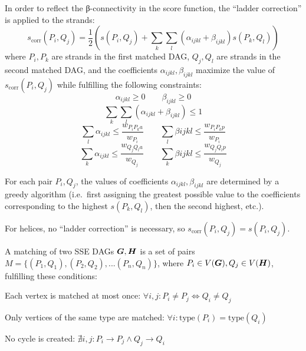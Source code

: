\documentclass{article}
\begin{document}
In order to reflect the β-connectivity in the score function, 
the ``ladder correction'' is applied to the strands:
  \[  s_\mathrm{corr}(P_i, Q_j) = \frac{1}{2} \left( s(P_i, Q_j) + \sum_k \sum_l (\alpha_{ijkl} + \beta_{ijkl}) s(P_k, Q_l) \right)  \]
where \(P_i, P_k\) are strands in the first matched DAG, 
\(Q_j, Q_l\) are strands in the second matched DAG, 
and the coefficients \(\alpha_{ijkl}, \beta_{ijkl}\) 
maximize the value of \(s_\mathrm{corr}(P_i, Q_j)\)
while fulfilling the following constraints:
  \[  \alpha_{ijkl} \geq 0 \qquad  \beta_{ijkl} \geq 0  \]
  \[  \sum_k \sum_l (\alpha_{ijkl} + \beta_{ijkl}) \leq 1  \]
  \[  \sum_l \alpha_{ijkl} \leq \frac{w_{P_i P_k a}}{w_{P_i}}  \qquad  \sum_l \beta{ijkl} \leq \frac{w_{P_i P_k p}}{w_{P_i}}  \]
  \[  \sum_k \alpha_{ijkl} \leq \frac{w_{Q_j Q_l a}}{w_{Q_j}}  \qquad  \sum_k \beta{ijkl} \leq \frac{w_{Q_j Q_l p}}{w_{Q_j}}  \]

For each pair \(P_i, Q_j\), the values of coefficients \(\alpha_{ijkl}, \beta_{ijkl}\) 
are determined by a greedy algorithm (i.e.~first assigning the greatest possible value 
to the coefficients corresponding to the highest \(s(P_k, Q_l)\), then the second highest, etc.). 

For helices, no ``ladder correction'' is necessary, so \(s_\mathrm{corr}(P_i, Q_j) = s(P_i, Q_j)\).

A matching of two SSE DAGs \(\boldsymbol{G}, \boldsymbol{H}\) is a set of pairs 
\(M = \{(P_1, Q_1), (P_2, Q_2), ... (P_n, Q_n)\}\),
where \(P_i \in V(\boldsymbol{G}), Q_j \in V(\boldsymbol{H})\), fulfilling these conditions:

\begin{denseitemize}     
  \item Each vertex is matched at most once: \(\forall i, j: P_i \neq P_j \Leftrightarrow Q_i \neq Q_j\)
  \item Only vertices of the same type are matched: \(\forall i: \mathrm{type}(P_i) = \mathrm{type}(Q_i)\)
  \item No cycle is created: \(\nexists i, j: P_i \rightarrow P_j \wedge Q_j \rightarrow Q_i\)
\end{denseitemize}
\end{document}
